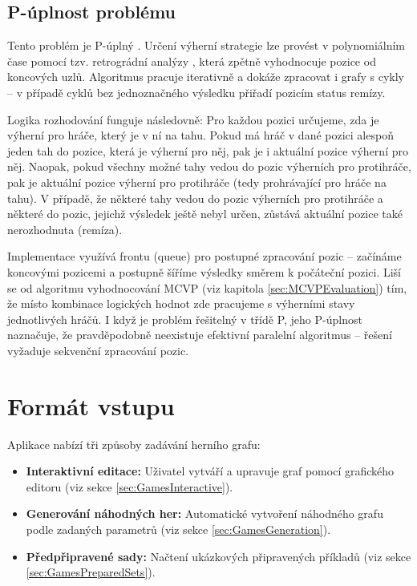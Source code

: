 \subsection{P-úplnost problému}
\label{sec:GamesCompleteness}

Tento problém je P-úplný \cite{sawa, miyano}. Určení výherní strategie lze provést v polynomiálním čase pomocí tzv. retrográdní analýzy \cite{sawa}, která zpětně vyhodnocuje pozice od koncových uzlů. Algoritmus pracuje iterativně a dokáže zpracovat i grafy s cykly – v případě cyklů bez jednoznačného výsledku přiřadí pozicím status remízy. 

Logika rozhodování funguje následovně: Pro každou pozici určujeme, zda je výherní pro hráče, který je v ní na tahu. Pokud má hráč v dané pozici alespoň jeden tah do pozice, která je výherní pro něj, pak je i aktuální pozice výherní pro něj. Naopak, pokud všechny možné tahy vedou do pozic výherních pro protihráče, pak je aktuální pozice výherní pro protihráče (tedy prohrávající pro hráče na tahu). V případě, že některé tahy vedou do pozic výherních pro protihráče a některé do pozic, jejichž výsledek ještě nebyl určen, zůstává aktuální pozice také nerozhodnuta (remíza).

Implementace využívá frontu (queue) pro postupné zpracování pozic – začínáme koncovými pozicemi a postupně šíříme výsledky směrem k počáteční pozici. Liší se od algoritmu vyhodnocování MCVP (viz kapitola \ref{sec:MCVPEvaluation}) tím, že místo kombinace logických hodnot zde pracujeme s výherními stavy jednotlivých hráčů. I když je problém řešitelný v třídě P, jeho P-úplnost naznačuje, že pravděpodobně neexistuje efektivní paralelní algoritmus – řešení vyžaduje sekvenční zpracování pozic.

\section{Formát vstupu}
\label{sec:GamesInput}

Aplikace nabízí tři způsoby zadávání herního grafu:

\begin{itemize}
    \item \textbf{Interaktivní editace:} Uživatel vytváří a upravuje graf pomocí grafického editoru (viz sekce \ref{sec:GamesInteractive}).
    \item \textbf{Generování náhodných her:} Automatické vytvoření náhodného grafu podle zadaných parametrů (viz sekce \ref{sec:GamesGeneration}).
    \item \textbf{Předpřipravené sady:} Načtení ukázkových připravených příkladů (viz sekce \ref{sec:GamesPreparedSets}).
\end{itemize}

